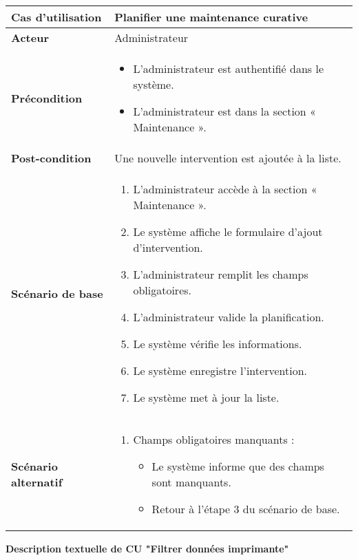 \documentclass[a4paper,11pt]{report}
\begin{document}
\begin{tabularx}{\textwidth}{|>{\bfseries}l|X|}
\hline
Cas d’utilisation    & Planifier une maintenance curative \\
\hline
Acteur               & Administrateur \\
\hline
Précondition         &
\begin{itemize}[left=0pt]
  \item L’administrateur est authentifié dans le système.
  \item  L’administrateur est dans la section « Maintenance ».
\end{itemize} \\
\hline
Post-condition       & Une nouvelle intervention est ajoutée à la liste. \\
\hline
Scénario de base     &
\begin{enumerate}[left=0pt]
  \item L’administrateur accède à la section « Maintenance ».
  \item Le système affiche le formulaire d’ajout d’intervention.
  \item L’administrateur remplit les champs obligatoires.
  \item L’administrateur valide la planification.
  \item Le système vérifie les informations.
  \item Le système enregistre l’intervention.
  \item Le système met à jour la liste.
\end{enumerate} \\
\hline
Scénario alternatif   &
\begin{enumerate}[label=\arabic*.a,wide=0pt]
  \item Champs obligatoires manquants :
    \begin{itemize}[left=1em]
      \item Le système informe que des champs sont manquants.
      \item Retour à l’étape 3 du scénario de base.
    \end{itemize}
\end{enumerate} \\
\hline
\end{tabularx}


\textbf{Description textuelle de CU "Filtrer données imprimante"}
\end{document}
